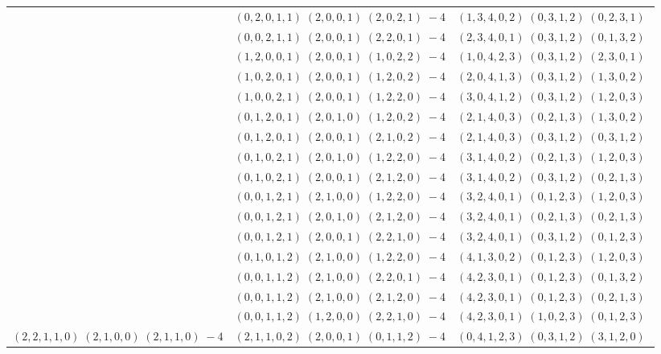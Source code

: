 \documentclass[11pt]{article}
\begin{document}
\begin{longtable}[l]{|c|c|c|}
 \cline{2-3} 
 & $(0 ,2 ,0 ,1 ,1) \;(2 ,0 ,0 ,1) \;(2 ,0 ,2 ,1) \;-4$ & $(1 ,3 ,4 ,0 ,2) \;(0 ,3 ,1 ,2) \;(0 ,2 ,3 ,1) \;$\\ 
 \cline{2-3} 
 & $(0 ,0 ,2 ,1 ,1) \;(2 ,0 ,0 ,1) \;(2 ,2 ,0 ,1) \;-4$ & $(2 ,3 ,4 ,0 ,1) \;(0 ,3 ,1 ,2) \;(0 ,1 ,3 ,2) \;$\\ 
 \cline{2-3} 
 & $(1 ,2 ,0 ,0 ,1) \;(2 ,0 ,0 ,1) \;(1 ,0 ,2 ,2) \;-4$ & $(1 ,0 ,4 ,2 ,3) \;(0 ,3 ,1 ,2) \;(2 ,3 ,0 ,1) \;$\\ 
 \cline{2-3} 
 & $(1 ,0 ,2 ,0 ,1) \;(2 ,0 ,0 ,1) \;(1 ,2 ,0 ,2) \;-4$ & $(2 ,0 ,4 ,1 ,3) \;(0 ,3 ,1 ,2) \;(1 ,3 ,0 ,2) \;$\\ 
 \cline{2-3} 
 & $(1 ,0 ,0 ,2 ,1) \;(2 ,0 ,0 ,1) \;(1 ,2 ,2 ,0) \;-4$ & $(3 ,0 ,4 ,1 ,2) \;(0 ,3 ,1 ,2) \;(1 ,2 ,0 ,3) \;$\\ 
 \cline{2-3} 
 & $(0 ,1 ,2 ,0 ,1) \;(2 ,0 ,1 ,0) \;(1 ,2 ,0 ,2) \;-4$ & $(2 ,1 ,4 ,0 ,3) \;(0 ,2 ,1 ,3) \;(1 ,3 ,0 ,2) \;$\\ 
 \cline{2-3} 
 & $(0 ,1 ,2 ,0 ,1) \;(2 ,0 ,0 ,1) \;(2 ,1 ,0 ,2) \;-4$ & $(2 ,1 ,4 ,0 ,3) \;(0 ,3 ,1 ,2) \;(0 ,3 ,1 ,2) \;$\\ 
 \cline{2-3} 
 & $(0 ,1 ,0 ,2 ,1) \;(2 ,0 ,1 ,0) \;(1 ,2 ,2 ,0) \;-4$ & $(3 ,1 ,4 ,0 ,2) \;(0 ,2 ,1 ,3) \;(1 ,2 ,0 ,3) \;$\\ 
 \cline{2-3} 
 & $(0 ,1 ,0 ,2 ,1) \;(2 ,0 ,0 ,1) \;(2 ,1 ,2 ,0) \;-4$ & $(3 ,1 ,4 ,0 ,2) \;(0 ,3 ,1 ,2) \;(0 ,2 ,1 ,3) \;$\\ 
 \cline{2-3} 
 & $(0 ,0 ,1 ,2 ,1) \;(2 ,1 ,0 ,0) \;(1 ,2 ,2 ,0) \;-4$ & $(3 ,2 ,4 ,0 ,1) \;(0 ,1 ,2 ,3) \;(1 ,2 ,0 ,3) \;$\\ 
 \cline{2-3} 
 & $(0 ,0 ,1 ,2 ,1) \;(2 ,0 ,1 ,0) \;(2 ,1 ,2 ,0) \;-4$ & $(3 ,2 ,4 ,0 ,1) \;(0 ,2 ,1 ,3) \;(0 ,2 ,1 ,3) \;$\\ 
 \cline{2-3} 
 & $(0 ,0 ,1 ,2 ,1) \;(2 ,0 ,0 ,1) \;(2 ,2 ,1 ,0) \;-4$ & $(3 ,2 ,4 ,0 ,1) \;(0 ,3 ,1 ,2) \;(0 ,1 ,2 ,3) \;$\\ 
 \cline{2-3} 
 & $(0 ,1 ,0 ,1 ,2) \;(2 ,1 ,0 ,0) \;(1 ,2 ,2 ,0) \;-4$ & $(4 ,1 ,3 ,0 ,2) \;(0 ,1 ,2 ,3) \;(1 ,2 ,0 ,3) \;$\\ 
 \cline{2-3} 
 & $(0 ,0 ,1 ,1 ,2) \;(2 ,1 ,0 ,0) \;(2 ,2 ,0 ,1) \;-4$ & $(4 ,2 ,3 ,0 ,1) \;(0 ,1 ,2 ,3) \;(0 ,1 ,3 ,2) \;$\\ 
 \cline{2-3} 
 & $(0 ,0 ,1 ,1 ,2) \;(2 ,1 ,0 ,0) \;(2 ,1 ,2 ,0) \;-4$ & $(4 ,2 ,3 ,0 ,1) \;(0 ,1 ,2 ,3) \;(0 ,2 ,1 ,3) \;$\\ 
 \cline{2-3} 
 & $(0 ,0 ,1 ,1 ,2) \;(1 ,2 ,0 ,0) \;(2 ,2 ,1 ,0) \;-4$ & $(4 ,2 ,3 ,0 ,1) \;(1 ,0 ,2 ,3) \;(0 ,1 ,2 ,3) \;$\\ \hline\multirow[t]{26}{*}{ $(2 ,2 ,1 ,1 ,0) \;(2 ,1 ,0 ,0) \;(2 ,1 ,1 ,0) \;-4$ }  & $(2 ,1 ,1 ,0 ,2) \;(2 ,0 ,0 ,1) \;(0 ,1 ,1 ,2) \;-4$ & $(0 ,4 ,1 ,2 ,3) \;(0 ,3 ,1 ,2) \;(3 ,1 ,2 ,0) \;$\\ 

\end{longtable}
\end{document}
